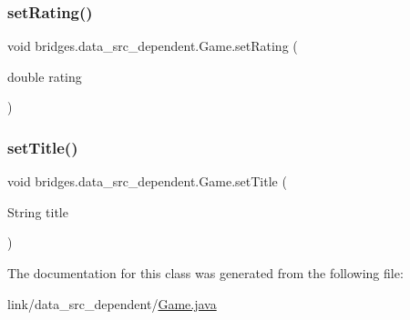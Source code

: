 \subsubsection{\texorpdfstring{set\+Rating()}{setRating()}}
{\footnotesize\ttfamily void bridges.\+data\+\_\+src\+\_\+dependent.\+Game.\+set\+Rating (\begin{DoxyParamCaption}\item[{double}]{rating }\end{DoxyParamCaption})}

\hypertarget{classbridges_1_1data__src__dependent_1_1_game_a0c87151b75bc10357aa6829ebfc0cae3}{}\label{classbridges_1_1data__src__dependent_1_1_game_a0c87151b75bc10357aa6829ebfc0cae3} 
\subsubsection{\texorpdfstring{set\+Title()}{setTitle()}}
{\footnotesize\ttfamily void bridges.\+data\+\_\+src\+\_\+dependent.\+Game.\+set\+Title (\begin{DoxyParamCaption}\item[{String}]{title }\end{DoxyParamCaption})}



The documentation for this class was generated from the following file\+:\begin{DoxyCompactItemize}
\item 
link/data\+\_\+src\+\_\+dependent/\hyperlink{_game_8java}{Game.\+java}\end{DoxyCompactItemize}
